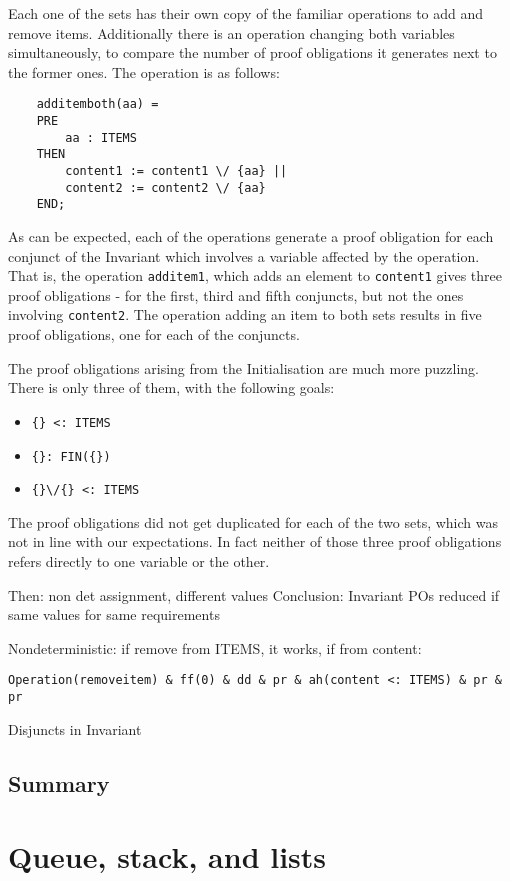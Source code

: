\documentclass[11pt,journal]{IEEEtran}
\begin{document}
	Each one of the sets has their own copy of the familiar operations to add and remove items. Additionally there is an operation changing both variables simultaneously, to compare the number of proof obligations it generates next to the former ones. The operation is as follows:
	
	\begin{lstlisting}
	additemboth(aa) =
	PRE
		aa : ITEMS
	THEN
		content1 := content1 \/ {aa} ||
		content2 := content2 \/ {aa}
	END;
	\end{lstlisting}
	
	As can be expected, each of the operations generate a proof obligation for each conjunct of the Invariant which involves a variable affected by the operation. That is, the operation \texttt{additem1}, which adds an element to \texttt{content1} gives three proof obligations - for the first, third and fifth conjuncts, but not the ones involving \texttt{content2}. The operation adding an item to both sets results in five proof obligations, one for each of the conjuncts.
	
	The proof obligations arising from the Initialisation are much more puzzling. There is only three of them, with the following goals:
	\begin{itemize}
		\item \verb|{} <: ITEMS |
		\item \verb|{}: FIN({}) |
		\item \verb|{}\/{} <: ITEMS|
	\end{itemize}
	The proof obligations did not get duplicated for each of the two sets, which was not in line with our expectations. In fact neither of those three proof obligations refers directly to one variable or the other.
	
	
	Then: non det assignment, different values
	Conclusion: Invariant POs reduced if same values for same requirements
	
	
	Nondeterministic:
	if remove from ITEMS, it works, if from content:
	
\verb|Operation(removeitem) & ff(0) & dd & pr & ah(content <: ITEMS) & pr & pr|

	Disjuncts in Invariant
	\subsection{Summary}
	
	\section{Queue, stack, and lists}
\end{document}
